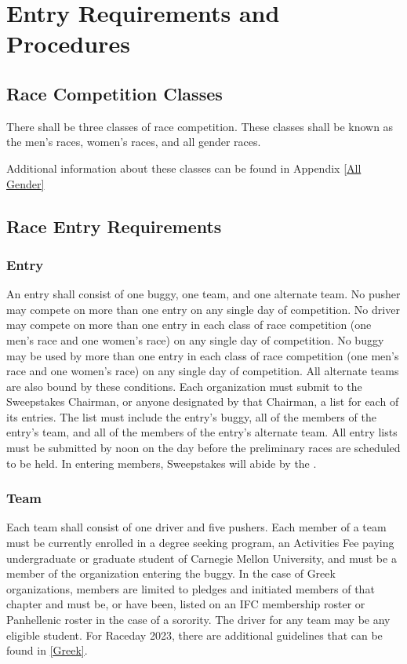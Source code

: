 \chapter{Entry Requirements and Procedures}

\section{Race Competition Classes}

	There shall be three classes of race competition. These classes shall be known as the men's races, women's races, and all gender races. 

	Additional information about these classes can be found in Appendix \ref*{All Gender}

\section{Race Entry Requirements}

\subsection{Entry}

An entry shall consist of one buggy, one team, and one alternate team. No pusher may compete on more than one entry on any single day of competition. No driver may compete on more than one entry in each class of race competition (one men's race and one women's race) on any single day of competition. No buggy may be used by more than one entry in each class of race competition (one men's race and one women's race) on any single day of competition. All alternate teams are also bound by these conditions. Each organization must submit to the Sweepstakes Chairman, or anyone designated by that Chairman, a list for each of its entries. The list must include the entry's buggy, all of the members of the entry's team, and all of the members of the entry's alternate team. All entry lists must be submitted by noon on the day before the preliminary races are scheduled to be held. In entering members, Sweepstakes will abide by the .

\subsection{Team}

	Each team shall consist of one driver and five pushers. Each member of a team must be currently enrolled in a degree seeking program, an Activities Fee paying undergraduate or graduate student of Carnegie Mellon University, and must be a member of the organization entering the buggy. In the case of Greek organizations, members are limited to pledges and initiated members of that chapter and must be, or have been, listed on an IFC membership roster or Panhellenic roster in the case of a sorority. The driver for any team may be any eligible student. For Raceday 2023, there are additional guidelines that can be found in \ref*{Greek}. 

